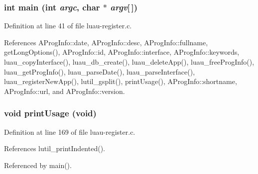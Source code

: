 \subsubsection{\setlength{\rightskip}{0pt plus 5cm}int main (int {\em argc}, char $\ast$ {\em argv}[$\,$])}\label{luau-register_8c_a2}




Definition at line 41 of file luau-register.c.

References AProg\-Info::date, AProg\-Info::desc, AProg\-Info::fullname, get\-Long\-Options(), AProg\-Info::id, AProg\-Info::interface, AProg\-Info::keywords, luau\_\-copy\-Interface(), luau\_\-db\_\-create(), luau\_\-delete\-App(), luau\_\-free\-Prog\-Info(), luau\_\-get\-Prog\-Info(), luau\_\-parse\-Date(), luau\_\-parse\-Interface(), luau\_\-register\-New\-App(), lutil\_\-gsplit(), print\-Usage(), AProg\-Info::shortname, AProg\-Info::url, and AProg\-Info::version.
\subsubsection{\setlength{\rightskip}{0pt plus 5cm}void print\-Usage (void)\hspace{0.3cm}{\tt  [static]}}\label{luau-register_8c_a0}




Definition at line 169 of file luau-register.c.

References lutil\_\-print\-Indented().

Referenced by main().